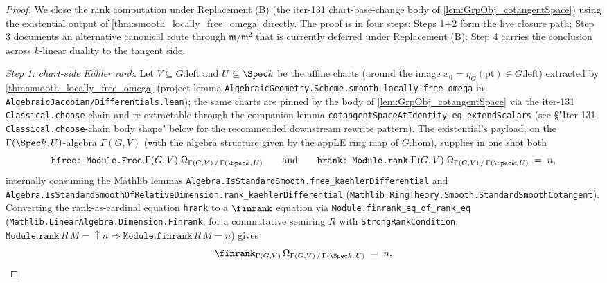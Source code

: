 \begin{proof}
  
  \leanok
  We close the rank computation under Replacement (B) (the iter-131 chart-base-change body of \cref{lem:GrpObj_cotangentSpace}) using the existential output of \cref{thm:smooth_locally_free_omega} directly. The proof is in four steps: Steps 1+2 form the live closure path; Step 3 documents an alternative canonical route through \(\mathfrak m / \mathfrak m^{2}\) that is currently deferred under Replacement (B); Step 4 carries the conclusion across \(k\)-linear duality to the tangent side.

  \emph{Step 1: chart-side Kähler rank.} Let \(V \subseteq G.\mathrm{left}\) and \(U \subseteq \Spec k\) be the affine charts (around the image \(x_0 = \eta_G(\mathrm{pt}) \in G.\mathrm{left}\)) extracted by \cref{thm:smooth_locally_free_omega} (project lemma \texttt{AlgebraicGeometry.Scheme.smooth\_locally\_free\_omega} in \texttt{AlgebraicJacobian/Differentials.lean}); the same charts are pinned by the body of \cref{lem:GrpObj_cotangentSpace} via the iter-131 \texttt{Classical.choose}-chain and re-extractable through the companion lemma \texttt{cotangentSpaceAtIdentity\_eq\_extendScalars} (see \S "Iter-131 \texttt{Classical.choose}-chain body shape" below for the recommended downstream rewrite pattern). The existential's payload, on the \(\Gamma(\Spec k, U)\)-algebra \(\Gamma(G, V)\) (with the algebra structure given by the appLE ring map of \(G.\mathrm{hom}\)), supplies in one shot both
  \[
    \texttt{hfree} \colon \;\texttt{Module.Free}\;\Gamma(G, V)\;\Omega_{\Gamma(G, V)\,/\,\Gamma(\Spec k,\,U)}
    \qquad\text{and}\qquad
    \texttt{hrank} \colon \;\texttt{Module.rank}\;\Gamma(G, V)\;\Omega_{\Gamma(G, V)\,/\,\Gamma(\Spec k,\,U)} \;=\; n,
  \]
  internally consuming the Mathlib lemmas \texttt{Algebra.IsStandardSmooth.free\_kaehlerDifferential} and \texttt{Algebra.IsStandardSmoothOfRelativeDimension.rank\_kaehlerDifferential} (\texttt{Mathlib.RingTheory.Smooth.StandardSmoothCotangent}). Converting the rank-as-cardinal equation \texttt{hrank} to a \(\finrank\) equation via \texttt{Module.finrank\_eq\_of\_rank\_eq} (\texttt{Mathlib.LinearAlgebra.Dimension.Finrank}; for a commutative semiring \(R\) with \texttt{StrongRankCondition}, \(\texttt{Module.rank}\,R\,M = \uparrow n \Rightarrow \texttt{Module.finrank}\,R\,M = n\)) gives
  \[
    \finrank_{\Gamma(G, V)}\,\Omega_{\Gamma(G, V)\,/\,\Gamma(\Spec k,\,U)} \;=\; n.
  \]


\end{proof}
